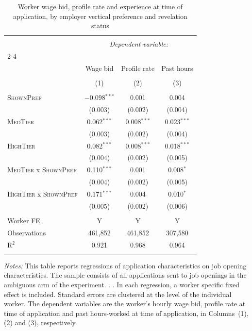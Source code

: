 
\begin{table}[!htbp] \centering 
  \caption{Worker wage bid, profile rate and experience at time of application, by employer vertical preference and revelation status} 
  \label{tab:bidding_effect} 
\small 
\begin{tabular}{@{\extracolsep{5pt}}lccc} 
\\[-1.8ex]\hline 
\hline \\[-1.8ex] 
 & \multicolumn{3}{c}{\textit{Dependent variable:}} \\ 
\cline{2-4} 
\\[-1.8ex] & Wage bid & Profile rate & Past hours \\ 
\\[-1.8ex] & (1) & (2) & (3)\\ 
\hline \\[-1.8ex] 
 \textsc{ShownPref} & $-$0.098$^{***}$ & 0.001 & 0.004 \\ 
  & (0.003) & (0.002) & (0.004) \\ 
  \textsc{MedTier} & 0.062$^{***}$ & 0.008$^{***}$ & 0.023$^{***}$ \\ 
  & (0.003) & (0.002) & (0.004) \\ 
  \textsc{HighTier} & 0.082$^{***}$ & 0.008$^{***}$ & 0.018$^{***}$ \\ 
  & (0.004) & (0.002) & (0.005) \\ 
  \textsc{MedTier} x \textsc{ShownPref} & 0.110$^{***}$ & 0.001 & 0.008$^{*}$ \\ 
  & (0.004) & (0.002) & (0.005) \\ 
  \textsc{HighTier} x \textsc{ShownPref} & 0.171$^{***}$ & 0.004 & 0.010$^{*}$ \\ 
  & (0.005) & (0.002) & (0.006) \\ 
 \hline \\[-1.8ex] 
Worker FE & Y & Y & Y \\ 
Observations & 461,852 & 461,852 & 307,580 \\ 
R$^{2}$ & 0.921 & 0.968 & 0.964 \\ 
\hline 
\hline \\[-1.8ex] 
\end{tabular}
\begin{minipage}{1\textwidth} 
 \emph{Notes:} This table reports regressions of application characteristics on job opening characteristics. 
 The sample consists of all applications sent to job openings in the ambiguous arm of the experiment.
\signaldef{}.
\ambigdef{}. 
In each regression, a worker specific fixed effect is included.
Standard errors are clustered at the level of the individual worker.
The dependent variables are the worker's hourly wage bid, profile rate at time of application and past hours-worked at time of application, in Columns~(1), (2) and (3), respectively. 
 \starlanguage
 \end{minipage}
\end{table}
